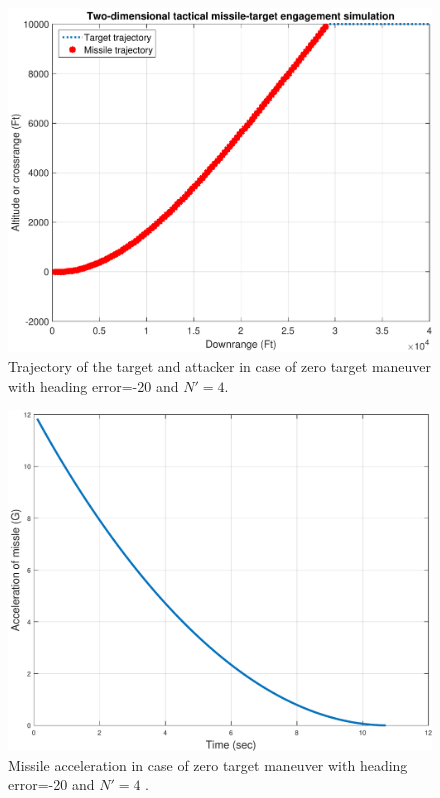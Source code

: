 \begin{figure}[H]
	\centering
	\includegraphics[scale = 0.57]{fig/trajectoryXNT0HE20N4.pdf}
	\caption{Trajectory of the target and attacker in case of zero target maneuver with heading error=-20 and $N'=4$.}
	\label{trajectory20N4}
\end{figure}


\begin{figure}[H]
	\centering
	\includegraphics[scale = 0.57]{fig/MissileAccelerationXNT0HE20N4.pdf}
	\caption{Missile acceleration in case of zero target maneuver with heading error=-20 and $N'=4$ .}
	\label{missile acceleration20N4}
\end{figure}


